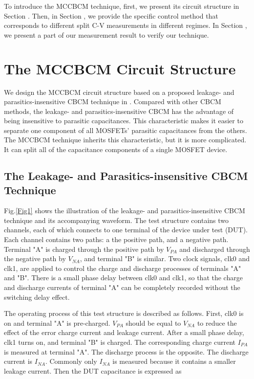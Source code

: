\documentclass[journal]{IEEEtran}
\begin{document}
To introduce the MCCBCM technique, first, we present its circuit structure in Section \uppercase\expandafter{}. Then, in Section \uppercase\expandafter{}, we provide the specific control method that corresponds to different split C-V measurements in different regimes. In Section \uppercase\expandafter{}, we present a part of our measurement result to verify our technique.





\section{The MCCBCM Circuit Structure}

We design the MCCBCM circuit structure based on a proposed leakage- and parasitics-insensitive CBCM technique in \cite{9}. Compared with other CBCM methods, the leakage- and parasitics-insensitive CBCM has the advantage of being insensitive to parasitic capacitances. This characteristic makes it easier to separate one component of all MOSFETs' parasitic capacitances from the others. The MCCBCM technique inherits this characteristic, but it is more complicated. It can split all of the capacitance components of a single MOSFET device.


\subsection{The Leakage- and Parasitics-insensitive CBCM Technique}

Fig.\ref{Fig1} shows the illustration of the leakage- and parasitics-insensitive CBCM technique and its accompanying waveform. The test structure contains two channels, each of which connects to one terminal of the device under test (DUT). Each channel contains two paths: a the positive path, and a negative path. Terminal "A" is charged through the positive path by $V_{PA}$ and discharged through the negative path by $V_{NA}$, and terminal "B" is similar. Two clock signals, clk0 and clk1, are applied to control the charge and discharge processes of terminals "A" and "B". There is a small phase delay between clk0 and clk1, so that the charge and discharge currents of terminal "A" can be completely recorded without the  switching delay effect.  


The operating process of this test structure is described as follows. First, clk0 is on and terminal "A" is pre-charged. $V_{PA}$ should be equal to $V_{NA}$ to reduce the effect of the error charge current and leakage current. After a small phase delay, clk1 turns on, and terminal "B" is charged. The corresponding charge current $I_{PA}$ is measured at terminal "A". The discharge process is the opposite. The discharge current is $I_{NA}$. Commonly only $I_{NA}$ is measured because it contains a smaller leakage current. Then the DUT capacitance is expressed as
\end{document}
